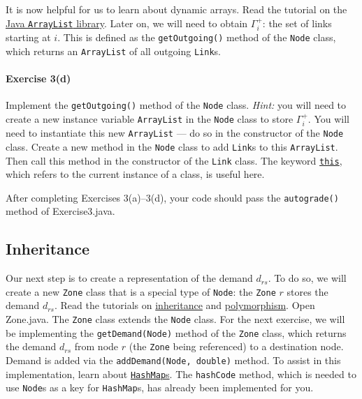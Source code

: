 \documentclass[12pt]{article}
\begin{document}
 \vspace{\baselineskip}

\noindent
It is now helpful for us to learn about dynamic arrays. Read the tutorial on the \href{https://www.w3schools.com/java/java_arraylist.asp}{Java \texttt{ArrayList} library}. Later on, we will need to obtain $\Gamma^+_i$: the set of links starting at $i$. This is defined as the \texttt{getOutgoing()} method of the \texttt{Node} class, which returns an \texttt{ArrayList} of all outgoing \texttt{Link}s.

\paragraph*{Exercise 3(d)} Implement the \texttt{getOutgoing()} method of the \texttt{Node} class. \textit{Hint:} you will need to create a new instance variable \texttt{ArrayList} in the \texttt{Node} class to store $\Gamma^+_i$. You will need to instantiate this new \texttt{ArrayList} --- do so in the constructor of the \texttt{Node} class.
Create a new method in the \texttt{Node} class to add \texttt{Link}s to this \texttt{ArrayList}. Then call this method in the constructor of the \texttt{Link} class. The keyword \href{https://www.w3schools.com/java/ref_keyword_this.asp}{\texttt{this}}, which refers to the current instance of a class, is useful here. 

 \vspace{\baselineskip}

\noindent
After completing Exercises 3(a)--3(d), your code should pass the \texttt{autograde()} method of Exercise3.java. 




\subsection{Inheritance}
\label{sec32}

Our next step is to create a representation of the demand $d_{rs}$. To do so, we will create a new \texttt{Zone} class that is a special type of \texttt{Node}: the \texttt{Zone} $r$ stores the demand $d_{rs}$. Read the tutorials on \href{https://www.w3schools.com/java/java_inheritance.asp}{inheritance} and \href{https://www.w3schools.com/java/java_polymorphism.asp}{polymorphism}. Open Zone.java. 
The \texttt{Zone} class extends the \texttt{Node} class. 
For the next exercise, we will be implementing the \texttt{getDemand(Node)} method of the \texttt{Zone} class, which returns the demand $d_{rs}$ from node $r$ (the \texttt{Zone} being referenced) to a destination node. 
Demand is added via the \texttt{addDemand(Node, double)} method. 
To assist in this implementation, learn about \href{https://www.w3schools.com/java/java_hashmap.asp}{\texttt{HashMap}s}. The \texttt{hashCode} method, which is needed to use \texttt{Node}s as a key for \texttt{HashMap}s, has already been implemented for you.  
	
\end{document}
